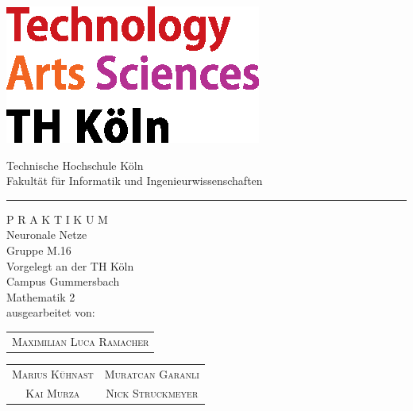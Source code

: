 \documentclass[a4paper,12pt,oneside]{article}
\begin{document}
  \pagestyle{empty} %
  \newpage %
  
  \newpage
  
  \pagestyle{empty}
  \begin{titlepage}
    \includegraphics[scale=1.00]{Sources/logo_TH-Koeln_CMYK_22pt}\\
    \begin{center}
      \Large
      Technische Hochschule Köln\\
      Fakultät für Informatik und Ingenieurwissenschaften\\
      \hrule\par\rule{0pt}{2cm} %
      \LARGE
      \textsc{P R A K T I K U M}\\
      \vspace{1cm} %
      \huge
      Neuronale Netze\\
      \Large
      Gruppe M.16\\
      \vspace{1.5cm}
      \large
      Vorgelegt an der TH Köln\\
      Campus Gummersbach\\
      Mathematik 2\\ 
      \vspace{1.0cm}
      ausgearbeitet von:\\
      \begin{tabular}{c}
        \textsc{Maximilian Luca Ramacher}
      \end{tabular}
      \begin{tabular}{c c}
        \textsc{Marius Kühnast} &
        \textsc{Muratcan Garanli}\\
        \textsc{Kai Murza} &
        \textsc{Nick Struckmeyer}\\
      \end{tabular}\\

\end{center}
\end{titlepage}
\end{document}
